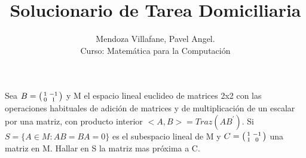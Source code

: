 \documentclass[12pt]{article}
\newenvironment{problem}[2][Problem]{\begin{trivlist}
\item[\hskip \labelsep {\bfseries #1}\hskip \labelsep {\bfseries #2.}]}{\end{trivlist}}
\newenvironment{xmat}
  {\left(\begin{smallmatrix}}
  {\end{smallmatrix}\right)}
\begin{document}
 
 
 
\title{Solucionario de Tarea Domiciliaria}%
\author{Mendoza Villafane, Pavel Angel.\\ %
Curso: Matemática para la Computación} %
 
\maketitle

 
\begin{problem}[Problema]{1}
Sea $B = \begin{xmat}1 & -1\\0 & 1\end{xmat}$ y M el espacio lineal euclideo de matrices 2x2 con las operaciones habituales de adición de matrices y de multiplicación de un escalar por una matriz, con producto interior $<A,B> = Traz(AB^{'})$. Si $S=\{A \in M : AB = BA = 0\}$ es el subespacio lineal de M y $C=\begin{xmat}1 & -1\\1 & 0\end{xmat}$ una matriz en M. Hallar en S la matriz mas próxima a C.
\end{problem}
 
\end{document}
